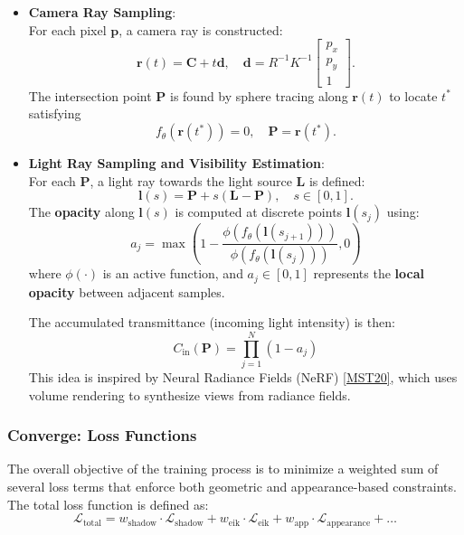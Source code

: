 \documentclass[12pt]{article}
\theoremstyle{definition}
\begin{document}
\begin{itemize}

    \item \textbf{Camera Ray Sampling}: \\
    For each pixel $\mathbf{p}$, a camera ray is constructed:
    \[
    \mathbf{r}(t) = \mathbf{C} + t \mathbf{d}, \quad \mathbf{d} = R^{-1} K^{-1} \begin{bmatrix} p_x \\ p_y \\ 1 \end{bmatrix}.
    \]
    The intersection point $\mathbf{P}$ is found by sphere tracing along $\mathbf{r}(t)$ to locate $t^*$ satisfying
    \[
    f_\theta(\mathbf{r}(t^*)) = 0, \quad \mathbf{P} = \mathbf{r}(t^*).
    \]

    \item \textbf{Light Ray Sampling and Visibility Estimation}: \\
    For each $\mathbf{P}$, a light ray towards the light source $\mathbf{L}$ is defined:
    \[
    \mathbf{l}(s) = \mathbf{P} + s (\mathbf{L} - \mathbf{P}), \quad s \in [0, 1].
    \]
    The \textbf{opacity} along $\mathbf{l}(s)$ is computed at discrete points $\mathbf{l}(s_j)$ using:
    \[
    a_j = \max\left( 1 - \frac{ \phi(f_\theta(\mathbf{l}(s_{j+1})) ) }{ \phi(f_\theta(\mathbf{l}(s_j))) }, 0 \right)
    \]
    where $\phi(\cdot)$ is an active function, and $a_j \in [0,1]$ represents the \textbf{local opacity} between adjacent samples.

    The accumulated transmittance (incoming light intensity) is then:
    \[
    C_{\mathrm{in}}(\mathbf{P}) = \prod_{j=1}^N (1 - a_j)
    \]
    This idea is inspired by Neural Radiance Fields (NeRF) \hyperlink{[MST20]}{[MST20]}, which uses volume rendering to synthesize views from radiance fields.
\end{itemize}

\subsubsection{Converge: Loss Functions} \label{sec:loss_functions}

The overall objective of the training process is to minimize a weighted sum of several loss terms that enforce both geometric and appearance-based constraints. The total loss function is defined as:
\begin{equation}
\mathcal{L}_{\text{total}} = w_{\text{shadow}} \cdot \mathcal{L}_{\text{shadow}} + w_{\text{eik}} \cdot \mathcal{L}_{\text{eik}} + w_{\text{app}} \cdot \mathcal{L}_{\text{appearance}} + \ldots
\end{equation}
\end{document}
